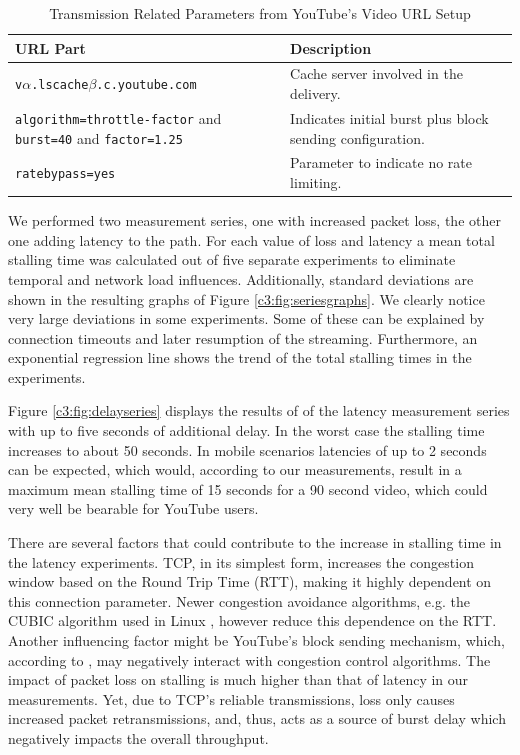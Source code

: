 \begin{table}[htbp]
\renewcommand{\arraystretch}{1.3}
\caption{Transmission Related Parameters from YouTube's Video URL Setup}
\label{c3:tbl:yturl}
\centering
\begin{tabular}{|p{4.7cm}||p{3.3cm}|}\hline
URL Part & Description \\ \hline \hline
\texttt{v$\alpha$.lscache$\beta$.c.youtube.com} &  Cache server involved in the delivery.\\ \hline
\texttt{algorithm=throttle-factor} and \texttt{burst=40} and \texttt{factor=1.25} & Indicates initial burst plus block sending configuration. \\ \hline
\texttt{ratebypass=yes} & Parameter to indicate no rate limiting.\\ \hline
\end{tabular}

\end{table}

We performed two measurement series, one with increased packet loss, the other one adding latency to the path. For each value of loss and latency a mean total stalling time was calculated out of five separate experiments to eliminate temporal and network load influences. Additionally, standard deviations are shown in the resulting graphs of Figure \ref{c3:fig:seriesgraphs}. We clearly notice very large deviations in some experiments. Some of these can be explained by connection timeouts and later resumption of the streaming. Furthermore, an exponential regression line shows the trend of the total stalling times in the experiments.


Figure \ref{c3:fig:delayseries} displays the results of of the latency measurement series with up to five seconds of additional delay. In the worst case the stalling time increases to about 50 seconds. In mobile scenarios latencies of up to 2 seconds can be expected, which would, according to our measurements, result in a maximum mean stalling time of 15 seconds for a 90 second video, which could very well be bearable for YouTube users.

There are several factors that could contribute to the increase in stalling time in the latency experiments. 
TCP, in its simplest form, increases the congestion window based on the Round Trip Time (RTT), making it highly dependent on this connection parameter. Newer congestion avoidance algorithms, e.g. the CUBIC algorithm used in Linux \cite{ha2008cubic}, however reduce this dependence on the RTT.
Another influencing factor might be YouTube's block sending mechanism, which, according to \cite{alcock2011afcyt}, may negatively interact with congestion control algorithms. The impact of packet loss on stalling is much higher than that of latency in our measurements. Yet, due to TCP's reliable transmissions, loss only causes increased packet retransmissions, and, thus, acts as a source of burst delay which negatively impacts the overall throughput.

